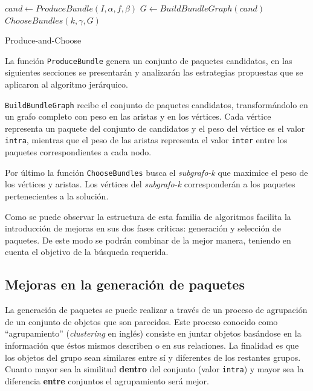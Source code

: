 \begin{center}
	\begin{algorithm}[H]
	\DontPrintSemicolon
	\SetAlgoLined
		$cand \leftarrow ProduceBundle(I,\alpha,f,\beta)$\;
		$G \leftarrow BuildBundleGraph(cand)$\;
		\Return $ChooseBundles(k,\gamma,G)$\;
	\caption{Produce-and-Choose}\label{alg:PAC}
	\end{algorithm}
\end{center}

La función \texttt{ProduceBundle} genera un conjunto de paquetes candidatos, en las siguientes secciones se presentarán y analizarán las estrategias propuestas que se aplicaron al algoritmo jerárquico.

\texttt{BuildBundleGraph} recibe el conjunto de paquetes candidatos, transformándolo en un grafo completo con peso en las aristas y en los vértices. Cada vértice representa un paquete del conjunto de candidatos y el peso del vértice es el valor \texttt{intra}, mientras que el peso de las aristas representa el valor \texttt{inter} entre los paquetes correspondientes a cada nodo. 

Por último la función \texttt{ChooseBundles} busca el \textit{subgrafo-k} que maximice el peso de los vértices y aristas. Los vértices del \textit{subgrafo-k} corresponderán a los paquetes pertenecientes a la solución.

Como se puede observar la estructura de esta familia de algoritmos facilita la introducción de mejoras en sus dos fases críticas: generación y selección de paquetes. De este modo se podrán combinar de la mejor manera, teniendo en cuenta el objetivo de la búsqueda requerida.

\subsection{Mejoras en la generación de paquetes}
La generación de paquetes se puede realizar a través de un proceso de agrupación de un conjunto de objetos que son parecidos. Este proceso conocido como ``agrupamiento'' (\textit{clustering} en inglés) \cite{wiki:clustering} consiste en juntar objetos basándose en la información que éstos mismos describen o en sus relaciones. La finalidad es que los objetos del grupo sean similares entre sí y diferentes de los restantes grupos. Cuanto mayor sea la similitud \textbf{dentro} del conjunto (valor \texttt{intra}) y mayor sea la diferencia \textbf{entre} conjuntos el agrupamiento será mejor.

